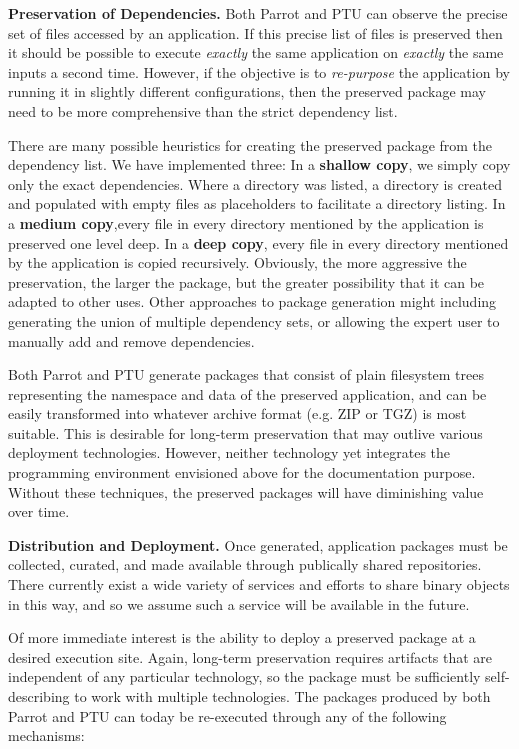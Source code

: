{\bf Preservation of Dependencies.}  Both Parrot and PTU can observe the precise
set of files accessed by an application.  If this precise list of files is preserved
then it should be possible to execute
\emph{exactly} the same application on \emph{exactly} the same inputs a second
time.  However, if the objective is to \emph{re-purpose} the application by running it in slightly different configurations, then the preserved package may need to
be more comprehensive than the strict dependency list.

There are many possible heuristics for creating the preserved package
from the dependency list.  We have implemented three:
In a {\bf shallow copy}, we simply copy only
the exact dependencies.  Where a directory was listed, a directory is created and populated with empty files as placeholders to facilitate a directory listing.  In a {\bf medium copy},every file in every directory mentioned by the application is preserved one level deep.  In a {\bf deep copy}, every file in every directory mentioned by the application is copied recursively.  Obviously, the more aggressive the preservation, the larger the package, but the greater possibility that it can be adapted to other uses.  Other approaches to package generation might including generating the union
of multiple dependency sets, or allowing the expert user to manually add
and remove dependencies.

Both Parrot and PTU generate packages that consist of plain filesystem trees representing the namespace and data of the preserved application, and can be easily transformed into whatever archive format (e.g. ZIP or TGZ) is most suitable.  This is desirable for long-term preservation that may outlive various deployment technologies.
However, neither technology yet integrates the programming environment envisioned above for the documentation purpose.  Without these techniques, the preserved packages will have diminishing value over time.

{\bf Distribution and Deployment.}
Once generated, application packages must be collected, curated, and made
available through publically shared repositories.  There currently exist a
wide variety of services and efforts to share binary objects in this way,
and so we assume such a service will be available in the future.

Of more immediate interest is the ability to deploy a preserved
package at a desired execution site.  Again, long-term preservation
requires artifacts that are independent of any particular technology,
so the package must be sufficiently self-describing
to work with multiple technologies.  The packages produced by both Parrot and PTU
can today be re-executed through any of the following mechanisms:

